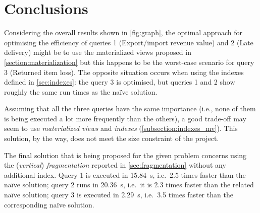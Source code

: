

\section{Conclusions}
\label{section:conclusions}

Considering the overall results shown in \autoref{fig:graph}, the optimal approach for optimising the efficiency of queries 1 (Export/import revenue value) and 2 (Late delivery) might be to use the materialized views proposed in \autoref{section:materialization} but this happens to be the worst-case scenario for query 3 (Returned item loss).
The opposite situation occurs when using the indexes defined in \autoref{sec:indexes}: the query 3 is optimised, but queries 1 and 2 show roughly the same run times as the na\"{i}ve solution.

Assuming that all the three queries have the same importance (i.e., none of them is being executed a lot more frequently than the others), a good trade-off may seem to use \textit{materialized views} and \textit{indexes} (\autoref{subsection:indexes_mv}). This solution, by the way, does not meet the size constraint of the project.

The final solution that is being proposed for the given problem concerns using the (\textit{vertical}) \textit{fragmentation} reported in \autoref{sec:fragmentation} without any additional index. Query 1 is executed in \SI{15.84}{\s}, i.e.\ 2.5 times faster than the na\"{i}ve solution; query 2 runs in \SI{20.36}{\s}, i.e.\ it is 2.3 times faster than the related na\"{i}ve solution; query 3 is executed in \SI{2.29}{\s}, i.e.\ 3.5 times faster than the corresponding na\"{i}ve solution.


